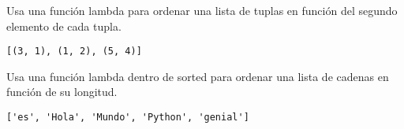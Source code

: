 \begin{exercise}
Usa una función lambda para ordenar una lista de tuplas en función del segundo elemento de cada tupla.
\begin{Shaded}
\begin{Highlighting}[]
\OperatorTok{=}\NormalTok{ [(}\NormalTok{, }\NormalTok{), (}\NormalTok{, }\NormalTok{), (}\NormalTok{, }\NormalTok{)]}
\OperatorTok{=} \OperatorTok{=}\NormalTok{ x: x[}\NormalTok{])}
\end{Highlighting}
\end{Shaded}

\begin{verbatim}
[(3, 1), (1, 2), (5, 4)]

\end{verbatim}
\end{exercise}

\begin{exercise}
Usa una función lambda dentro de sorted para ordenar una lista de cadenas en función de su longitud.
\begin{Shaded}
\begin{Highlighting}[]
\OperatorTok{=}\NormalTok{ [}\NormalTok{, }\NormalTok{, }\NormalTok{, }\NormalTok{, }\NormalTok{]}
\OperatorTok{=} \OperatorTok{=}
\end{Highlighting}
\end{Shaded}

\begin{verbatim}
['es', 'Hola', 'Mundo', 'Python', 'genial']

\end{verbatim}
\end{exercise}

